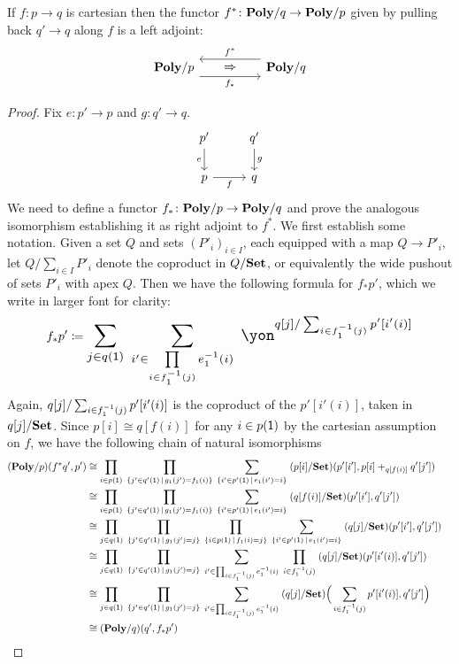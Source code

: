 \documentclass[Book-Poly]{subfiles}
\begin{document}
\begin{theorem}\label{thm.cart_exponentiable}
If $f\colon p\to q$ is cartesian then the functor $f^*\colon\mathbf{Poly}/q\to\mathbf{Poly}/p$ given by pulling back $q'\to q$ along $f$ is a left adjoint:
\[
\begin{tikzcd}[column sep=50pt, background color=theoremcolor]
	\poly/p\ar[r, shift right=7pt, "f_*"']&
	\poly/q\ar[l, shift right=7pt, "f^*"']\ar[l, phantom, "\Rightarrow"]
\end{tikzcd}
\]
\end{theorem}
\begin{proof}
Fix $e\colon p'\to p$ and $g\colon q'\to q$.
\[
\begin{tikzcd}
	p'\ar[d, "e"']&q'\ar[d, "g"]\\
	p\ar[r, "f"']&q
\end{tikzcd}
\]
We need to define a functor $f_*\colon\mathbf{Poly}/p\to\mathbf{Poly}/q$ and prove the analogous isomorphism establishing it as right adjoint to $f^*$. We first establish some notation. Given a set $Q$ and sets $(P'_i)_{i\in I}$, each equipped with a map $Q\to P'_i$, let $Q/\sum_{i\in I}P'_i$ denote the coproduct in $Q/\mathbf{Set}$, or equivalently the wide pushout of sets $P'_i$ with apex $Q$. Then we have the following formula for $f_*p'$, which we write in larger font for clarity:
\begin{equation}\label{eqn.cart_exp}
f_*p'\coloneqq
\scalebox{1.3}{$\displaystyle
\sum_{j\in q(\1)}\;\sum_{i'\in\prod\limits_{i\in f_1\inv(j)}e_1\inv(i)}\;\yon^{q[j]/\sum_{i\in f_1\inv(j)}p'[i'(i)]}
$}
\end{equation}
Again, $q[j]/\sum_{i\in f_1^{-1}(j)}p'[i'(i)]$ is the coproduct of the $p'[i'(i)]$, taken in $q[j]/\mathbf{Set}$. Since $p[i]\cong q[f(i)]$ for any $i\in p(\textsf{1})$ by the cartesian assumption on $f$, we have the following chain of natural isomorphisms
\begin{align*}
	(\mathbf{Poly}/p)(f^*q', p')&\cong
	\prod_{i\in p(\textsf{1})}\;\prod_{\{j'\in q'(\textsf{1})\,\mid\,g_1(j')=f_1(i)\}}\;\sum_{\{i'\in p'(\textsf{1})\,\mid\,e_1(i')=i\}}\;(p[i]/\mathbf{Set})(p'[i'],p[i]+_{q[f(i)]}q'[j'])\\&\cong
	\prod_{i\in p(\textsf{1})}\;\prod_{\{j'\in q'(\textsf{1})\,\mid\,g_1(j')=f_1(i)\}}\;\sum_{\{i'\in p'(\textsf{1})\,\mid\,e_1(i')=i\}}\;(q[f(i)]/\mathbf{Set})(p'[i'],q'[j'])\\&\cong
	\prod_{j\in q(\textsf{1})}\;\prod_{\{j'\in q'(\textsf{1})\,\mid\, g_1(j')=j\}}\;\prod_{\{i\in p(\textsf{1})\,\mid\,f_1(i)=j\}}\;\sum_{\{i'\in p'(\textsf{1})\,\mid\,e_1(i')=i\}}\;(q[j]/\mathbf{Set})(p'[i'],q'[j'])\\&\cong
	\prod_{j\in q(\textsf{1})}\;\prod_{\{j'\in q'(\textsf{1})\,\mid\, g_1(j')=j\}}\;\sum_{i'\in\prod_{i\in f_1^{-1}(j)}e_1^{-1}(i)}\;\prod_{i\in f_1^{-1}(j)}\;(q[j]/\mathbf{Set})(p'[i'(i)],q'[j'])\\&\cong
	\prod_{j\in q(\textsf{1})}\;\prod_{\{j'\in q'(\textsf{1})\,\mid\, g_1(j')=j\}}\;\sum_{i'\in\prod_{i\in f_1^{-1}(j)}e_1^{-1}(i)}\;(q[j]/\mathbf{Set})\Big(\sum_{i\in f_1^{-1}(j)}p'[i'(i)],q'[j']\Big)\\&\cong
	(\mathbf{Poly}/q)(q',f_*p')
	&\qedhere
\end{align*}
\end{proof}
\end{document}
